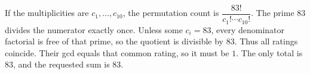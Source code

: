 If the multiplicities are $c_1,\ldots,c_{10}$, the permutation count is $\dfrac{83!}{c_1!\cdots c_{10}!}$. The prime $83$ divides the numerator exactly once. Unless some $c_i=83$, every denominator factorial is free of that prime, so the quotient is divisible by $83$. Thus all ratings coincide. Their gcd equals that common rating, so it must be $1$. The only total is $83$, and the requested sum is $\boxed{83}$.

